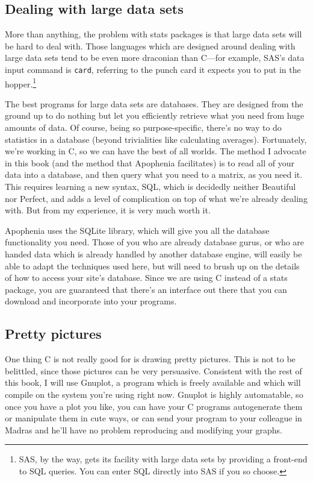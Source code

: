 \documentclass[12pt,notitlepage, openany]{book}
\begin{document}
\subsection{Dealing with large data sets} More than anything, the problem
with stats packages is that large data sets will be hard to deal
with. Those languages which are designed around dealing with large data
sets tend to be even more draconian than C---for example, SAS's data
input command is {\tt card}, referring to the punch card it expects you
to put in the hopper.\footnote{SAS, by the way, gets its facility with large data sets
by providing a front-end to SQL queries. You can enter SQL directly into
SAS if you so choose.}

The best programs for large data sets are databases. They are designed
from the ground up to do nothing but let you efficiently retrieve what you
need from huge amounts of data.  Of course, being so purpose-specific,
there's no way to do statistics in a database (beyond trivialities like calculating
averages). Fortunately, we're working in C, so we can have the best of
all worlds. The method I advocate in this book (and the method that
Apophenia facilitates) is to read all of your
data into a database, and then query what you need to a matrix, as you
need it. This requires learning a new syntax, SQL, which is decidedly
neither Beautiful nor Perfect, and adds a level of complication on top
of what we're already dealing with. But from my experience, it is very
much worth it.

Apophenia  uses the SQLite library, which will
give you all the database functionality you need. Those of you who are
already database gurus, or who are handed data which is already handled
by another database engine, will easily be able to adapt the techniques
used here, but will need to brush up on the details of how to access
your site's database. Since we are using C instead of a stats package,
you are guaranteed that there's an interface out there that you can
download and incorporate into your programs.

\subsection{Pretty pictures} One thing C is not really good for is drawing
pretty pictures. This is not to be belittled, since those pictures
can be very persuasive. Consistent with the rest of this book, I will use
Gnuplot, a program which is freely available and which will compile on
the system you're using right now. Gnuplot is highly automatable, so once
you have a plot you like, you can have your C programs autogenerate
them or manipulate them in cute ways, or can send your program to your
colleague in Madras and he'll have no problem reproducing and modifying
your graphs.
\end{document}

